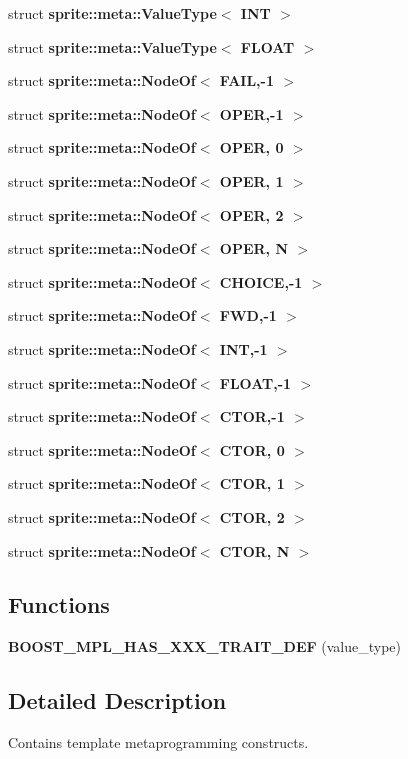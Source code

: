\begin{CompactItemize}
struct {\bf sprite::meta::Value\-Type$<$ INT $>$}
\item 
struct {\bf sprite::meta::Value\-Type$<$ FLOAT $>$}
\item 
struct {\bf sprite::meta::Node\-Of$<$ FAIL,-1 $>$}
\item 
struct {\bf sprite::meta::Node\-Of$<$ OPER,-1 $>$}
\item 
struct {\bf sprite::meta::Node\-Of$<$ OPER, 0 $>$}
\item 
struct {\bf sprite::meta::Node\-Of$<$ OPER, 1 $>$}
\item 
struct {\bf sprite::meta::Node\-Of$<$ OPER, 2 $>$}
\item 
struct {\bf sprite::meta::Node\-Of$<$ OPER, N $>$}
\item 
struct {\bf sprite::meta::Node\-Of$<$ CHOICE,-1 $>$}
\item 
struct {\bf sprite::meta::Node\-Of$<$ FWD,-1 $>$}
\item 
struct {\bf sprite::meta::Node\-Of$<$ INT,-1 $>$}
\item 
struct {\bf sprite::meta::Node\-Of$<$ FLOAT,-1 $>$}
\item 
struct {\bf sprite::meta::Node\-Of$<$ CTOR,-1 $>$}
\item 
struct {\bf sprite::meta::Node\-Of$<$ CTOR, 0 $>$}
\item 
struct {\bf sprite::meta::Node\-Of$<$ CTOR, 1 $>$}
\item 
struct {\bf sprite::meta::Node\-Of$<$ CTOR, 2 $>$}
\item 
struct {\bf sprite::meta::Node\-Of$<$ CTOR, N $>$}
\end{CompactItemize}
\subsection*{Functions}
\begin{CompactItemize}
\item 
{\bf BOOST\_\-MPL\_\-HAS\_\-XXX\_\-TRAIT\_\-DEF} (value\_\-type)\label{namespacesprite_1_1meta_a0}

\end{CompactItemize}


\subsection{Detailed Description}
Contains template metaprogramming constructs. 